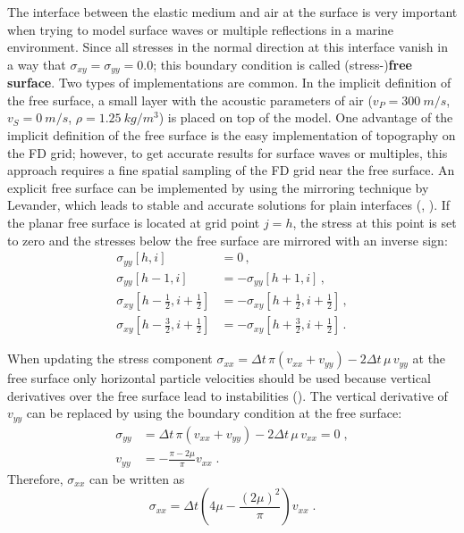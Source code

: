 The interface between the elastic medium and air at the surface is very important when trying to model surface waves or multiple reflections in a marine environment. Since all stresses in the normal direction at this interface vanish in a way that $\sigma_{xy} = \sigma_{yy}=0.0$; this boundary condition is called (stress-){\textbf{free surface}}. Two types of implementations are common. In the implicit definition of the free surface, a small layer with the acoustic parameters of air ($v_P=\SI{300}{m/s}$, $v_S=\SI{0}{m/s}$, $\rho=\SI{1.25}{kg/m^3}$) is placed on top of the model. One advantage of the implicit definition of the free surface is the easy implementation of topography on the FD grid; however, to get accurate results for surface waves or multiples, this approach requires a fine spatial sampling of the FD grid near the free surface. An explicit free surface can be implemented by using the mirroring technique by Levander, which leads to stable and accurate solutions for plain interfaces (\cite{levander:88}, \cite{robertsson:95}). If the planar free surface is located at grid point $j=h$, the stress at this point is set to zero and the stresses below the free surface are mirrored with an inverse sign:
\begin{equation}
\begin{split}
        \sigma_{yy}[h,i] &= 0\,,\\
        \sigma_{yy}[h-1,i] &= - \sigma_{yy}[h+1,i]\,,\\
        \sigma_{xy}[h-\frac{1}{2},i+\frac{1}{2}] &= - \sigma_{xy}[h+\frac{1}{2},i+\frac{1}{2}]\,,\\
        \sigma_{xy}[h-\frac{3}{2},i+\frac{1}{2}] &= - \sigma_{xy}[h+\frac{3}{2},i+\frac{1}{2}]\,.
\end{split}
\end{equation}

When updating the stress component $\sigma_{xx}=\Delta t\, \pi (v_{xx} + v_{yy}) -2 {\Delta t}\, \mu\, v_{yy}$ at the free surface only horizontal particle velocities should be used because vertical derivatives over the free surface lead to instabilities (\cite{levander:88}). 
The vertical derivative of $v_{yy}$ can be replaced by using the boundary condition at the free surface:
\begin{equation}
\begin{split}
    \sigma_{yy} &= {\Delta t}\, \pi\left(v_{xx} + v_{yy}\right)  - 2 {\Delta t}\, \mu\, v_{xx} = 0\;,\\
    v_{yy} &= - \frac{\pi-2\mu}{\pi} v_{xx}\;.
\end{split}
\end{equation}
Therefore, $\sigma_{xx}$ can be written as
\begin{equation}
\sigma_{xx}={\Delta t}\left(4\mu -\frac{(2\mu)^2}{\pi} \right) v_{xx}\;.
\end{equation}

